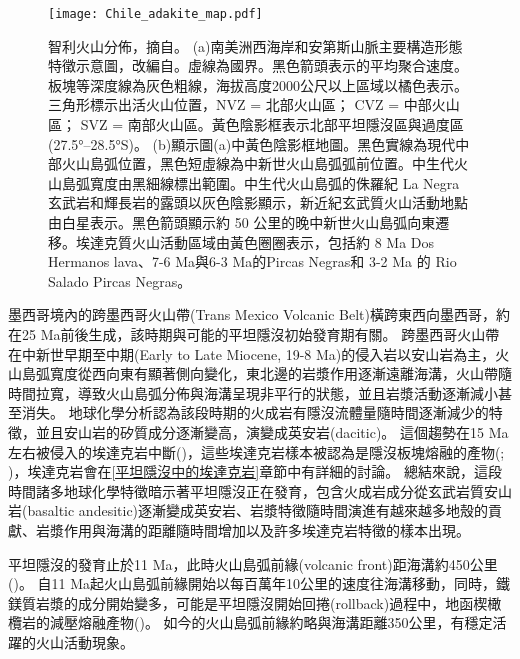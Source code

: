 \begin{figure*}[ht!]
    \centering
    \texttt{[image: Chile\_adakite\_map.pdf]}
    \caption[智利火山分佈，摘自\citealp{goss2009extreme}]{智利火山分佈，摘自\citealp{goss2009extreme}。
    (a)南美洲西海岸和安第斯山脈主要構造形態特徵示意圖，改編自\citealp{lamb2003cenozoic}。虛線為國界。黑色箭頭表示\citealp{demets1990current}的平均聚合速度。板塊等深度線為灰色粗線，海拔高度2000公尺以上區域以橘色表示。三角形標示出活火山位置，NVZ = 北部火山區； CVZ = 中部火山區； SVZ = 南部火山區。黃色陰影框表示北部平坦隱沒區與過度區(27.5°–28.5°S)。
    (b)顯示圖(a)中黃色陰影框地圖。黑色實線為現代中部火山島弧位置，黑色短虛線為中新世火山島弧弧前位置。中生代火山島弧寬度由黑細線標出範圍。中生代火山島弧的侏羅紀 La Negra 玄武岩和輝長岩的露頭以灰色陰影顯示，新近紀玄武質火山活動地點由白星表示。黑色箭頭顯示約 50 公里的晚中新世火山島弧向東遷移。埃達克質火山活動區域由黃色圈圈表示，包括約 8 Ma Dos Hermanos lava、7-6 Ma與6-3 Ma的Pircas Negras和 3-2 Ma 的 Rio Salado Pircas Negras。
    }
    \label{fig::Chile_adakite_map}
\end{figure*}


墨西哥境內的跨墨西哥火山帶(Trans Mexico Volcanic Belt)橫跨東西向墨西哥，約在25 Ma前後生成，該時期與可能的平坦隱沒初始發育期有關。
跨墨西哥火山帶在中新世早期至中期(Early to Late Miocene, 19-8 Ma)的侵入岩以安山岩為主，火山島弧寬度從西向東有顯著側向變化，東北邊的岩漿作用逐漸遠離海溝，火山帶隨時間拉寬，導致火山島弧分佈與海溝呈現非平行的狀態，並且岩漿活動逐漸減小甚至消失。
地球化學分析認為該段時期的火成岩有隱沒流體量隨時間逐漸減少的特徵，並且安山岩的矽質成分逐漸變高，演變成英安岩(dacitic)。
這個趨勢在15 Ma左右被侵入的埃達克岩中斷(\citealp{mori2007effects})，這些埃達克岩樣本被認為是隱沒板塊熔融的產物(\citealp{gomez2003temporal}; \citealp{mori2007effects})，埃達克岩會在\ref{平坦隱沒中的埃達克岩}章節中有詳細的討論。
總結來說，這段時間諸多地球化學特徵暗示著平坦隱沒正在發育，包含火成岩成分從玄武岩質安山岩(basaltic andesitic)逐漸變成英安岩、岩漿特徵隨時間演進有越來越多地殼的貢獻、岩漿作用與海溝的距離隨時間增加以及許多埃達克岩特徵的樣本出現。

平坦隱沒的發育止於11 Ma，此時火山島弧前緣(volcanic front)距海溝約450公里(\citealp{Manea2011Thermal})。
自11 Ma起火山島弧前緣開始以每百萬年10公里的速度往海溝移動，同時，鐵鎂質岩漿的成分開始變多，可能是平坦隱沒開始回捲(rollback)過程中，地函楔橄欖岩的減壓熔融產物(\citealp{gomez2003temporal})。
如今的火山島弧前緣約略與海溝距離350公里，有穩定活躍的火山活動現象。

